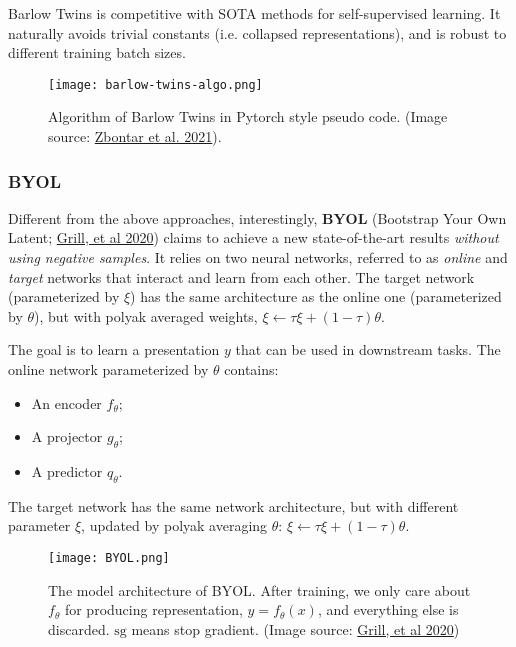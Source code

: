 \documentclass[12pt]{article}
\begin{document}
Barlow Twins is competitive with SOTA methods for self-supervised learning. It naturally avoids trivial constants (i.e. collapsed representations), and is robust to different training batch sizes.

\begin{figure}[H]
    \centering
    \texttt{[image: barlow-twins-algo.png]}
    \caption{Algorithm of Barlow Twins in Pytorch style pseudo code. (Image source: \href{https://arxiv.org/abs/2103.03230}{Zbontar et al. 2021}).}
\end{figure}

\subsubsection{BYOL}

Different from the above approaches, interestingly, \textbf{BYOL} (Bootstrap Your Own Latent; \href{https://arxiv.org/abs/2006.07733}{Grill, et al 2020}) claims to achieve a new state-of-the-art results \emph{without using negative samples}. It relies on two neural networks, referred to as \emph{online} and \emph{target} networks that interact and learn from each other. The target network (parameterized by $\xi$) has the same architecture as the online one (parameterized by $\theta$), but with polyak averaged weights, $\xi \leftarrow \tau \xi + (1-\tau) \theta$.

The goal is to learn a presentation $y$ that can be used in downstream tasks. The online network parameterized by $\theta$ contains:
\begin{itemize}
    \item An encoder $f_\theta$;
    \item A projector $g_\theta$;
    \item A predictor $q_\theta$.
\end{itemize}
The target network has the same network architecture, but with different parameter $\xi$, updated by polyak averaging $\theta$: $\xi \leftarrow \tau \xi + (1-\tau) \theta$.

\begin{figure}[H]
    \centering
    \texttt{[image: BYOL.png]}
    \caption{The model architecture of BYOL. After training, we only care about $f_\theta$ for producing representation, $y=f_\theta(x)$, and everything else is discarded. $\text{sg}$ means stop gradient. (Image source: \href{https://arxiv.org/abs/2006.07733}{Grill, et al 2020})}
\end{figure}
\end{document}
